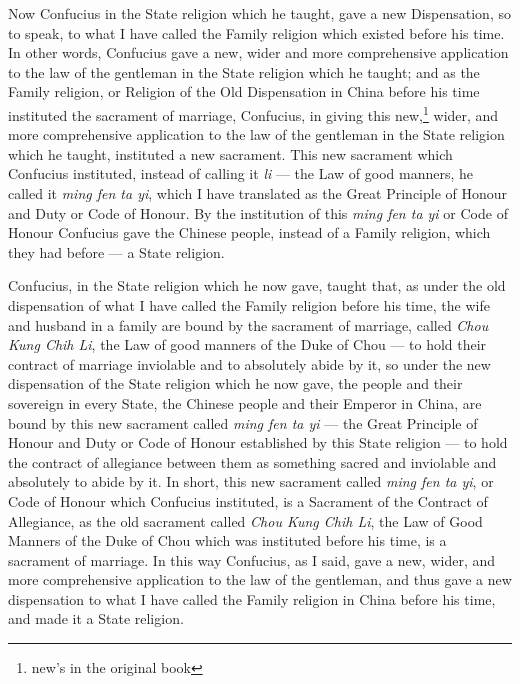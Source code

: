 Now Confucius in the State religion which he taught, gave a new Dispensation, so to speak, to what I have called the Family religion which existed before his time.
In other words, Confucius gave a new, wider and more comprehensive application to the law of the gentleman in the State religion which he taught; and as the Family religion, or Religion of the Old Dispensation in China before his time instituted the sacrament of marriage, Confucius, in giving this new,\footnote{new's in the original book} wider, and more comprehensive application to the law of the gentleman in the State religion which he taught, instituted a new sacrament.
This new sacrament which Confucius instituted, instead of calling it \emph{li} --- the Law of good manners, he called it {\em{ming fen ta yi}}, which I have translated as the Great Principle of Honour and Duty or Code of Honour.
By the institution of this {\em{ming fen ta yi}} or Code of Honour Confucius gave the Chinese people, instead of a Family religion, which they had before --- a State religion.

Confucius, in the State religion which he now gave, taught that, as under the old dispensation of what I have called the Family religion before his time, the wife and husband in a family are bound by the sacrament of marriage, called \emph{Chou Kung Chih Li}, the Law of good manners of the Duke of Chou --- to hold their contract of marriage inviolable and to absolutely abide by it, so under the new dispensation of the State religion which he now gave, the people and their sovereign in every State, the Chinese people and their Emperor in China, are bound by this new sacrament called {\em{ming fen ta yi}} --- the Great Principle of Honour and Duty or Code of Honour established by this State religion --- to hold the contract of allegiance between them as something sacred and inviolable and absolutely to abide by it.
In short, this new sacrament called {\em{ming fen ta yi}}, or Code of Honour which Confucius instituted, is a Sacrament of the Contract of Allegiance, as the old sacrament called \emph{Chou Kung Chih Li}, the Law of Good Manners of the Duke of Chou which was instituted before his time, is a sacrament of marriage.
In this way Confucius, as I said, gave a new, wider, and more comprehensive application to the law of the gentleman, and thus gave a new dispensation to what I have called the Family religion in China before his time, and made it a State religion.


